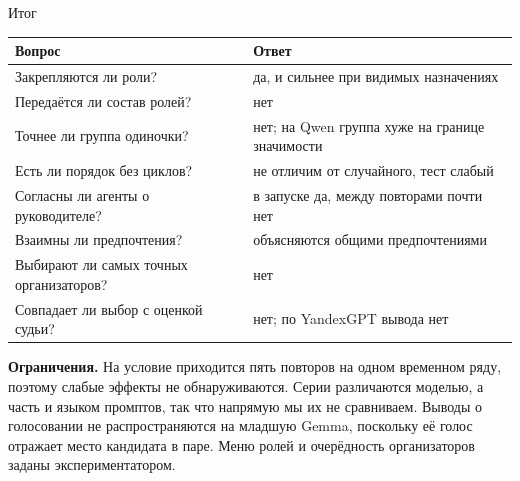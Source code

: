 \documentclass[aspectratio=169,11pt]{beamer}
\begin{document}
\begin{frame}{Итог}
\footnotesize
\renewcommand{\arraystretch}{1.25}
\begin{tabular}{@{}ll@{}}
\toprule
Вопрос & Ответ\\
\midrule
Закрепляются ли роли? & да, и сильнее при видимых назначениях\\
Передаётся ли состав ролей? & нет\\
Точнее ли группа одиночки? & нет; на Qwen группа хуже на границе значимости\\
Есть ли порядок без циклов? & не отличим от случайного, тест слабый\\
Согласны ли агенты о руководителе? & в запуске да, между повторами почти нет\\
Взаимны ли предпочтения? & объясняются общими предпочтениями\\
Выбирают ли самых точных организаторов? & нет\\
Совпадает ли выбор с оценкой судьи? & нет; по YandexGPT вывода нет\\
\bottomrule
\end{tabular}

\bigskip
\footnotesize\textbf{Ограничения.} На условие приходится пять повторов на одном временном ряду, поэтому слабые эффекты не обнаруживаются. Серии различаются моделью, а часть и языком промптов, так что напрямую мы их не сравниваем. Выводы о голосовании не распространяются на младшую Gemma, поскольку её голос отражает место кандидата в паре. Меню ролей и очерёдность организаторов заданы экспериментатором.
\end{frame}
\end{document}
